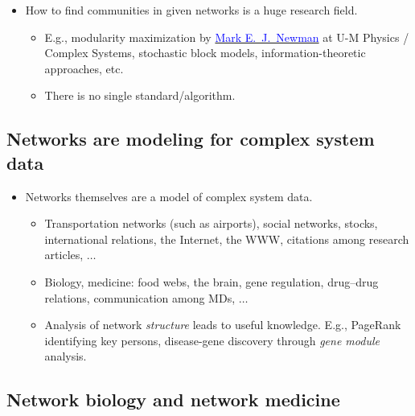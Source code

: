 \documentclass[20pt]{extarticle}
\newcommand{\hrefc}[2]{\href{#1}{\textcolor{blue}{#2}}}
\begin{document}
\begin{itemize}
\item How to find communities in given networks is a huge research field.
	\begin{itemize}
	\item E.g., modularity maximization by \hrefc{https://websites.umich.edu/~mejn/}{Mark E.~J.~Newman} at U-M Physics / Complex Systems, stochastic block models, information-theoretic approaches, etc.
	\item There is no single standard/algorithm.
	\end{itemize}
\end{itemize}

\subsection*{Networks are modeling for complex system data}

\begin{itemize}
\item Networks themselves are a model of complex system data.
	\begin{itemize}
	\item Transportation networks (such as airports), social networks, stocks, international relations, the Internet, the WWW, citations among research articles, $\ldots$
	\item Biology, medicine: food webs, the brain, gene regulation, drug--drug relations, communication among MDs, $\ldots$
	\item Analysis of network \emph{structure} leads to useful knowledge. E.g., PageRank identifying key persons, disease-gene discovery through \emph{gene module} analysis.
	\end{itemize}
\end{itemize}


\subsection*{Network biology and network medicine}
\end{document}
